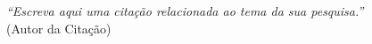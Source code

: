 
\begin{epigrafe}
    \vspace*{\fill}
    \begin{flushright}
        \textit{``Escreva aqui uma citação relacionada ao tema
        da sua pesquisa.''}\\
        (Autor da Citação)
    \end{flushright}
\end{epigrafe}
